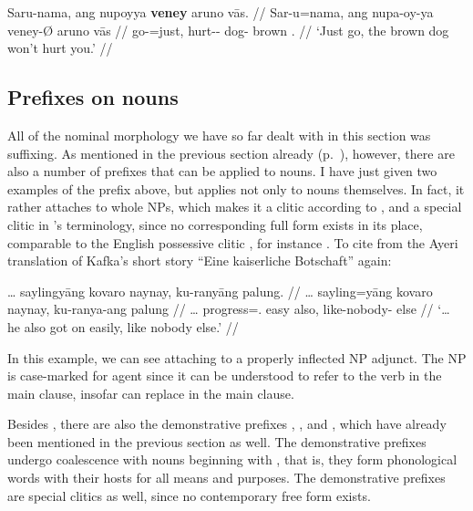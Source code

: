 \ex\begingl
	\gla Saru-nama, ang nupoyya \textbf{veney} aruno vās. //
	\glb Sar-u=nama, ang nupa-oy-ya veney-Ø aruno vās //
	\glc go-\Imp{}=just, \AgtT{} hurt-\Neg{}-\TsgM{} dog-\Top{} brown 
		\Ssg{}.\Parg{} //
	\glft `Just go, the brown dog won't hurt you.' //
\endgl\xe


\subsection{Prefixes on nouns}
\label{subsec:nounpref}

All of the nominal morphology we have so far dealt with in this section was
suffixing. As mentioned in the previous section already
(p.~\pageref{nounprefixes}), however, there are also a number of prefixes that
can be applied to nouns. I have just given two examples of the prefix
 above, but  applies not only to nouns themselves. In fact, it rather attaches to whole NPs, which makes it a
clitic according to \citet[117]{klavans1985}, and a special
clitic in \citeauthor{zwicky1977}'s terminology, since no corresponding full
form exists in its place, comparable to the English possessive clitic ,
for instance \parencites[3,
13]{zwicky1977}[295]{zwicky1985}[510]{zwickypullum1983}. To cite from the Ayeri
translation of Kafka's short story \enquote{Eine kaiserliche Botschaft} again:

\ex\label{ex:kukafka2}\begingl
	\gla … saylingyāng kovaro naynay, ku-ranyāng palung. //
	\glb … sayling=yāng kovaro naynay, ku-ranya-ang palung //
	\glc … progress=\TsgM{}.\Aarg{} easy also, like-nobody-\Aarg{} else //
	\glft `… he also got on easily, like nobody else.'%
	//
\endgl\xe

In this example, we can see  attaching to a properly inflected
NP adjunct. The NP is case-marked for agent since it can be understood to refer
to the verb  in the main clause, insofar
 can replace 
 in the main clause.

Besides , there are also the demonstrative prefixes
, , and , which
have already been mentioned in the previous section as well. The demonstrative
prefixes undergo coalescence with nouns beginning with , that is, they
form phonological words with their hosts for all means and purposes. The
demonstrative prefixes are special clitics as well, since no contemporary free
form exists.

